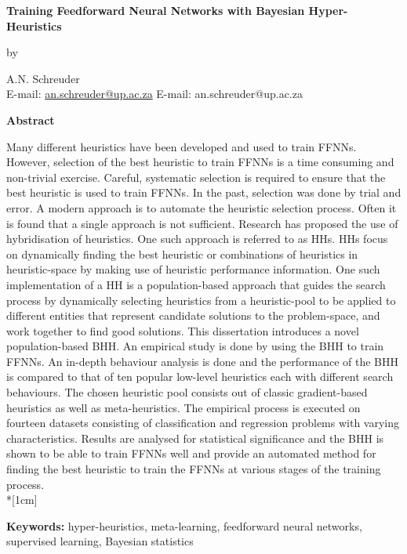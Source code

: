 \pagestyle{empty}

\begin{center}
    \Large
    \textbf{Training Feedforward Neural Networks with Bayesian Hyper-Heuristics}
    \vspace{0.5cm}

    \normalsize
    by
    \vspace{0.5cm}

    \normalsize
    A.N. Schreuder\\
    \ifpdf
        E-mail: \href{mailto:an.schreuder@up.ac.za}{an.schreuder@up.ac.za}
    \else
        E-mail: an.schreuder@up.ac.za
    \fi
    \vspace{1cm}

    \Large
    \textbf{Abstract}
\end{center}
\noindent
Many different heuristics have been developed and used to train \acfp{FFNN}.  However, selection of the best heuristic to train \acp{FFNN} is a time consuming and non-trivial exercise. Careful, systematic selection is required to ensure that the best heuristic is used to train \acp{FFNN}. In the past, selection was done by trial and error. A modern approach is to automate the heuristic selection process. Often it is found that a single approach is not sufficient. Research has proposed the use of hybridisation of heuristics. One such approach is referred to as \acfp{HH}. \acsp{HH} focus on dynamically finding the best heuristic or combinations of heuristics in heuristic-space by making use of heuristic performance information. One such implementation of a \acs{HH} is a population-based approach that guides the search process by dynamically selecting heuristics from a heuristic-pool to be applied to different entities that represent candidate solutions to the problem-space, and work together to find good solutions. This dissertation introduces a novel population-based \Acf{BHH}. An empirical study is done by using the \acs{BHH} to train \acsp{FFNN}. An in-depth behaviour analysis is done and the performance of the \acs{BHH} is compared to that of ten popular low-level heuristics each with different search behaviours. The chosen heuristic pool consists out of classic gradient-based heuristics as well as meta-heuristics. The empirical process is executed on fourteen datasets consisting of classification and regression problems with varying characteristics. Results are analysed for statistical significance and the \acs{BHH} is shown to be able to train \acsp{FFNN} well and provide an automated method for finding the best heuristic to train the \acsp{FFNN} at various stages of the training process.\\*[1cm]
\noindent
\parbox{\textwidth}{
    \textbf{Keywords:} hyper-heuristics, meta-learning, feedforward neural networks, supervised learning, Bayesian statistics
}
\vfill
\newpage